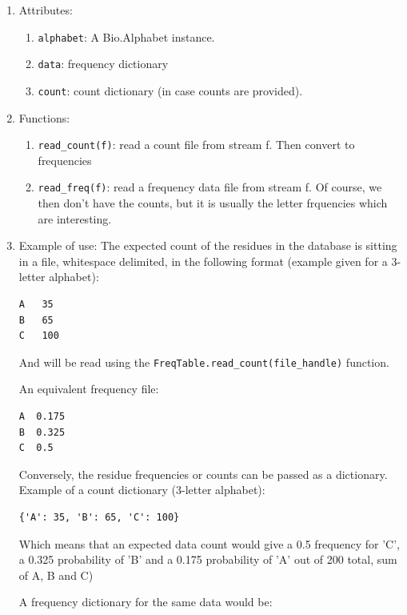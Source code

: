 \documentclass{report}
\begin{document}
\begin{enumerate}

  \item Attributes:
 

  \begin{enumerate}
    \item \verb|alphabet|: A Bio.Alphabet instance.
    \item \verb|data|: frequency dictionary
    \item \verb|count|: count dictionary (in case counts are provided).
  \end{enumerate}

  \item Functions:
  \begin{enumerate}
    \item \verb|read_count(f)|: read a count file from stream f. Then convert to frequencies
    \item \verb|read_freq(f)|: read a frequency data file from stream f. Of course, we then don't have the counts, but it is usually the letter frquencies which are interesting.
  \end{enumerate}

  \item Example of use:
  The expected count of the residues in the database is sitting in a file, whitespace delimited, in the following format (example given for a 3-letter alphabet):

\begin{verbatim}
A   35
B   65
C   100
\end{verbatim}

And will be read using the \verb|FreqTable.read_count(file_handle)| function.

An equivalent frequency file:

\begin{verbatim}
A  0.175
B  0.325
C  0.5
\end{verbatim}

Conversely, the residue frequencies or counts can be passed as a dictionary.
Example of a count dictionary (3-letter alphabet):

\begin{verbatim}
{'A': 35, 'B': 65, 'C': 100}
\end{verbatim}

Which means that an expected data count would give a 0.5 frequency
for 'C', a 0.325 probability of 'B' and a 0.175 probability of 'A'
out of 200 total, sum of A, B and C)

 A frequency dictionary for the same data would be:


\end{enumerate}
\end{document}
